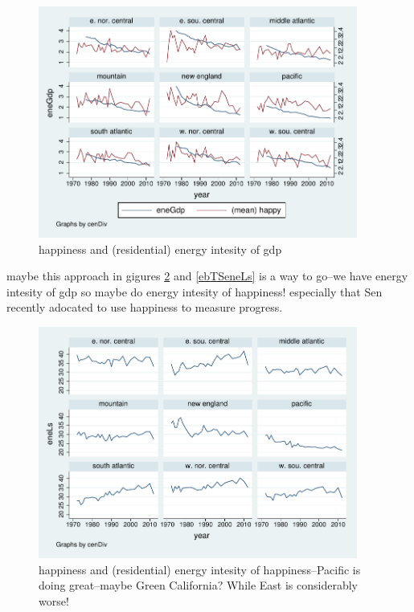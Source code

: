 \documentclass[10pt, letterpaper]{article}
\begin{document}
\begin{spacing}{1.4}
\begin{figure}[H]
 \includegraphics[height=3in]{graphsAndTables/cenDiveneGdp.pdf}\centering
\caption{happiness and (residential) energy intesity of gdp}\label{cenDiveneGdp}
\end{figure}

maybe this approach in gigures \ref{cenDiveneLs} and \ref{ebTSeneLs} is a way to
go--we have energy intesity of gdp so maybe do energy intesity of happiness!
especially that Sen recently adocated to use happiness to measure progress.

\begin{figure}[H]
 \includegraphics[height=3in]{graphsAndTables/cenDiveneLs.pdf}\centering
\caption{happiness and (residential) energy intesity of happiness--Pacific is
  doing great--maybe Green California? While East is considerably worse! }\label{cenDiveneLs}
\end{figure}


\end{spacing}
\end{document}

